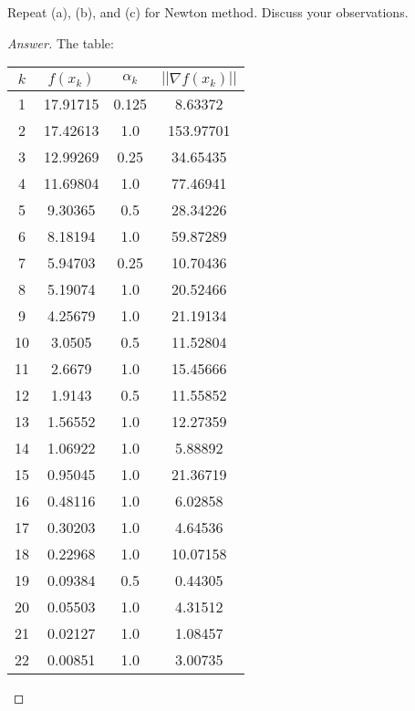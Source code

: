 \documentclass{article}
\newcommand{\norm}[1]{\left|\left|#1\right|\right|}
\begin{document}
        \item Repeat (a), (b), and (c) for Newton method. Discuss your observations.
        \begin{proof}[Answer]
        The table:\\
        \begin{center}
        \begin{tabular}{|c|c|c|c|}
        \hline 
        $k$ & $f(x_k)$ & $\alpha_k$ & 
        $\norm{\nabla f(x_k)}$ \\
        \hline
        1 & 17.91715 & 0.125 & 8.63372 \\ 
        \hline
        2 & 17.42613 & 1.0 & 153.97701 \\ 
        \hline
        3 & 12.99269 & 0.25 & 34.65435 \\ 
        \hline
        4 & 11.69804 & 1.0 & 77.46941 \\ 
        \hline
        5 & 9.30365 & 0.5 & 28.34226 \\ 
        \hline
        6 & 8.18194 & 1.0 & 59.87289 \\ 
        \hline
        7 & 5.94703 & 0.25 & 10.70436 \\ 
        \hline
        8 & 5.19074 & 1.0 & 20.52466 \\ 
        \hline
        9 & 4.25679 & 1.0 & 21.19134 \\ 
        \hline
        10 & 3.0505 & 0.5 & 11.52804 \\ 
        \hline
        11 & 2.6679 & 1.0 & 15.45666 \\ 
        \hline
        12 & 1.9143 & 0.5 & 11.55852 \\ 
        \hline
        13 & 1.56552 & 1.0 & 12.27359 \\ 
        \hline
        14 & 1.06922 & 1.0 & 5.88892 \\ 
        \hline
        15 & 0.95045 & 1.0 & 21.36719 \\ 
        \hline
        16 & 0.48116 & 1.0 & 6.02858 \\ 
        \hline
        17 & 0.30203 & 1.0 & 4.64536 \\ 
        \hline
        18 & 0.22968 & 1.0 & 10.07158 \\ 
        \hline
        19 & 0.09384 & 0.5 & 0.44305 \\ 
        \hline
        20 & 0.05503 & 1.0 & 4.31512 \\ 
        \hline
        21 & 0.02127 & 1.0 & 1.08457 \\ 
        \hline
        22 & 0.00851 & 1.0 & 3.00735 \\ 

\end{tabular}
\end{center}
\end{proof}
\end{document}
